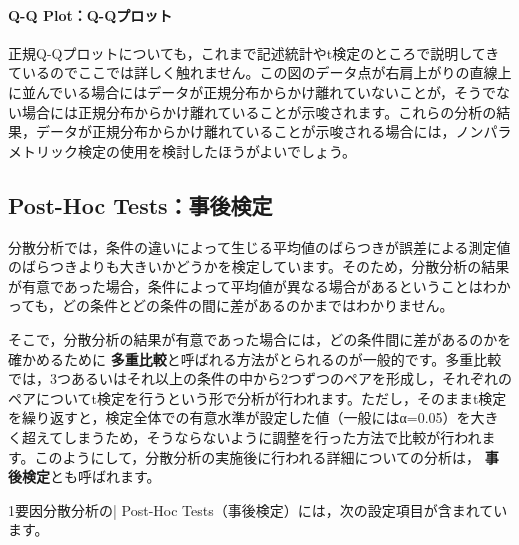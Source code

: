 \documentclass[
  12pt,
  a5jpaper,
  lualatex, ja=standard]{bxjsbook}
\renewcommand{\emph}[1]{\textbf{\color{emph} #1}}
\begin{document}
\hypertarget{q-q-plotq-qux30d7ux30edux30c3ux30c8-1}{%
\paragraph*{Q-Q Plot：Q-Qプロット}\label{q-q-plotq-qux30d7ux30edux30c3ux30c8-1}}

正規Q-Qプロットについても，これまで記述統計やt検定のところで説明してきているのでここでは詳しく触れません。この図のデータ点が右肩上がりの直線上に並んでいる場合にはデータが正規分布からかけ離れていないことが，そうでない場合には正規分布からかけ離れていることが示唆されます。これらの分析の結果，データが正規分布からかけ離れていることが示唆される場合には，ノンパラメトリック検定の使用を検討したほうがよいでしょう。

\hypertarget{sub:ANOVA-oneway-posthoc}{%
\subsection{Post-Hoc Tests：事後検定}\label{sub:ANOVA-oneway-posthoc}}

分散分析では，条件の違いによって生じる平均値のばらつきが誤差による測定値のばらつきよりも大きいかどうかを検定しています。そのため，分散分析の結果が有意であった場合，条件によって平均値が異なる場合があるということはわかっても，どの条件とどの条件の間に差があるのかまではわかりません。

そこで，分散分析の結果が有意であった場合には，どの条件間に差があるのかを確かめるために\emph{多重比較}と呼ばれる方法がとられるのが一般的です。多重比較では，3つあるいはそれ以上の条件の中から2つずつのペアを形成し，それぞれのペアについてt検定を行うという形で分析が行われます。ただし，そのままt検定を繰り返すと，検定全体での有意水準が設定した値（一般にはα=0.05）を大きく超えてしまうため，そうならないように調整を行った方法で比較が行われます。このようにして，分散分析の実施後に行われる詳細についての分析は，\emph{事後検定}とも呼ばれます。

1要因分散分析の\colorbox{bar}{\textcolor{gmoji2}{| Post-Hoc Tests}}（事後検定）には，次の設定項目が含まれています。
\end{document}
